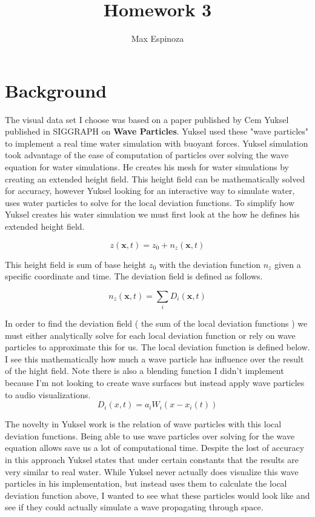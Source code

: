 \documentclass[11pt]{article}
\title{\textbf{Homework 3}}
\author{Max Espinoza}
\date{}
\begin{document}
\maketitle

\section{Background}

\hspace{4ex}The visual data set I choose was based on a paper published by Cem Yuksel published in SIGGRAPH on \textbf{Wave Particles}.
Yuksel used these "wave particles" to implement a real time water simulation with buoyant forces. 
Yuksel simulation took advantage of the ease of computation of particles over solving the wave equation for water simulations.
He creates his mesh for water simulations by creating an extended height field. This height field can be mathematically solved for accuracy, however Yuksel looking for an interactive way to simulate water, uses water particles to solve for the local deviation functions.
To simplify how Yuksel creates his water simulation we must first look at the how he defines his extended height field.

\begin{equation}
z(\textbf{x},t) = z_0 + n_z(\textbf{x},t)
\end{equation}

This height field is sum of base height $z_0$ with the deviation function $n_z$ given a specific coordinate and time.
The deviation field is defined as follows.

\begin{equation}
n_z(\textbf{x},t) = \sum\limits_{i} D_i(\textbf{x},t)
\end{equation}

In order to find the deviation field ( the sum of the local deviation functions ) we must either analytically solve for each local deviation function or rely on wave particles to approximate this for us.
The local deviation function is defined below. I see this mathematically how much a wave particle has influence over the result of the hight field. Note there is also a blending function I didn't implement because I'm not looking to create wave surfaces but instead apply wave particles to audio visualizations.
\begin{equation}
D_i(x,t) = a_i W_i(x-x_i(t))
\end{equation}


The novelty in Yuksel work is the relation of wave particles with this local deviation functions.
Being able to use wave particles over solving for the wave equation allows save us a lot of computational time. Despite the lost of accuracy in this approach Yuksel states that under certain constants that the results are very similar to real water.
While Yuksel never actually does visualize this wave particles in his implementation, but instead uses them to calculate the local deviation function above, I wanted to see what these particles would look like and see if they could actually simulate a wave propagating through space.
\end{document}
